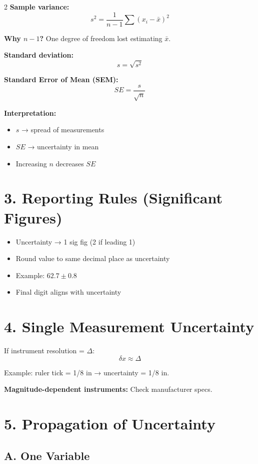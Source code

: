\documentclass[10pt,landscape]{article}
\begin{document}
\begin{multicols}{2}
\textbf{Sample variance:}
\[
s^2 = \frac{1}{n-1}\sum (x_i - \bar{x})^2
\]

\textbf{Why $n-1$?} One degree of freedom lost estimating $\bar{x}$.

\textbf{Standard deviation:}
\[
s = \sqrt{s^2}
\]

\textbf{Standard Error of Mean (SEM):}
\[
\boxed{SE = \frac{s}{\sqrt{n}}}
\]

\textbf{Interpretation:}
\begin{itemize}
\item $s$ → spread of measurements
\item $SE$ → uncertainty in mean
\item Increasing $n$ decreases $SE$
\end{itemize}

\section*{3. Reporting Rules (Significant Figures)}

\begin{itemize}
\item Uncertainty → 1 sig fig (2 if leading 1)
\item Round value to same decimal place as uncertainty
\item Example: $62.7 \pm 0.8$
\item Final digit aligns with uncertainty
\end{itemize}

\section*{4. Single Measurement Uncertainty}

If instrument resolution = $\Delta$:
\[
\delta x \approx \Delta
\]

Example: ruler tick = 1/8 in → uncertainty = 1/8 in.

\textbf{Magnitude-dependent instruments:} Check manufacturer specs.

\section*{5. Propagation of Uncertainty}

\subsection*{A. One Variable}


\end{multicols}
\end{document}
